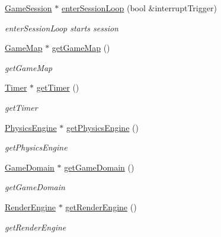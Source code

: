 \begin{DoxyCompactItemize}
\item 
\hyperlink{classGameSession}{Game\+Session} $\ast$ \hyperlink{classGameSession_a8bc1efa84d25d89fb0978c374052998f}{enter\+Session\+Loop} (bool \&interrupt\+Trigger)
\begin{DoxyCompactList}\small\item\em enter\+Session\+Loop starts session \end{DoxyCompactList}\item 
\hyperlink{classGameMap}{Game\+Map} $\ast$ \hyperlink{classGameSession_a53cf338c7ef00eec4c66cd782aa1c75b}{get\+Game\+Map} ()
\begin{DoxyCompactList}\small\item\em get\+Game\+Map \end{DoxyCompactList}\item 
\hyperlink{classTimer}{Timer} $\ast$ \hyperlink{classGameSession_ae83e20db424a495a5c5e77a3d49bc99f}{get\+Timer} ()
\begin{DoxyCompactList}\small\item\em get\+Timer \end{DoxyCompactList}\item 
\hyperlink{classPhysicsEngine}{Physics\+Engine} $\ast$ \hyperlink{classGameSession_a4f114298b92076ac0cde3d522966acde}{get\+Physics\+Engine} ()
\begin{DoxyCompactList}\small\item\em get\+Physics\+Engine \end{DoxyCompactList}\item 
\hyperlink{classGameDomain}{Game\+Domain} $\ast$ \hyperlink{classGameSession_acd1b9636d6c956c6d8a1b379de8d34ee}{get\+Game\+Domain} ()
\begin{DoxyCompactList}\small\item\em get\+Game\+Domain \end{DoxyCompactList}\item 
\hyperlink{classRenderEngine}{Render\+Engine} $\ast$ \hyperlink{classGameSession_a7b517a74945fe5a5100fad30fdd4a40b}{get\+Render\+Engine} ()
\begin{DoxyCompactList}\small\item\em get\+Render\+Engine \end{DoxyCompactList}\end{DoxyCompactItemize}

